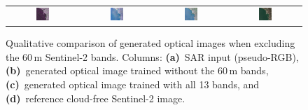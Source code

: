 \begin{figure}[h!]
\begin{tabular}{cccc}
        \includegraphics[width=0.2\textwidth, height=0.2\textheight, keepaspectratio]{img/exclusion_60_m/bands10/sample_000065_sar_pseudo.png} &
        \includegraphics[width=0.2\textwidth, height=0.2\textheight, keepaspectratio]{img/exclusion_60_m/bands10/sample_000065_pred_rgb.png} &
        \includegraphics[width=0.2\textwidth, height=0.2\textheight, keepaspectratio]{img/exclusion_60_m/bands13/sample_000065_pred_rgb.png} &
        \includegraphics[width=0.2\textwidth, height=0.2\textheight, keepaspectratio]{img/exclusion_60_m/bands10/sample_000065_true_rgb.png} \\
    \end{tabular}

    \caption[Qualitative results when excluding 60\,m bands]{%
    Qualitative comparison of generated optical images when excluding the 60\,m Sentinel-2 bands. 
    Columns: \textbf{(a)}~SAR input (pseudo-RGB), 
    \textbf{(b)}~generated optical image trained without the 60\,m bands, 
    \textbf{(c)}~generated optical image trained with all 13 bands, and 
    \textbf{(d)}~reference cloud-free Sentinel-2 image.}
    \label{fig:ablation_excluding_60m_qualitative}
\end{figure}


